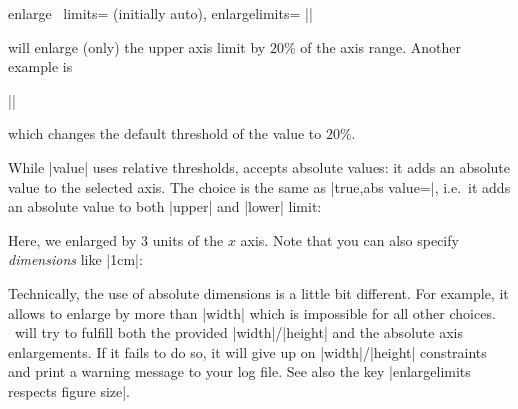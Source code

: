 \begin{pgfplotsxykeylist}{%
	enlarge \x\ limits= (initially auto),
	enlargelimits=}
		||
	
	will enlarge (only) the upper axis limit by $20\%$ of the axis range. Another example is

		||

	which changes the default threshold of the  value to $20\%$.
\begin{codeexample}[]
\end{codeexample}


	 While |value| uses relative thresholds,  accepts absolute values: it adds an absolute value to the selected axis. The choice  is the same as |true,abs value=|, i.e.\ it adds an absolute value to both |upper| and |lower| limit:
\begin{codeexample}[]
\end{codeexample}
	\noindent Here, we enlarged by $3$ units of the $x$ axis. Note that you can also specify \emph{dimensions} like |1cm|:
\begin{codeexample}[]
\end{codeexample}
	\noindent Technically, the use of absolute dimensions is a little bit different. For example, it allows to enlarge by more than |width| which is impossible for all other choices. \PGFPlots\ will try to fulfill both the provided |width|/|height| and the absolute axis enlargements. If it fails to do so, it will give up on |width|/|height| constraints and print a warning message to your log file. See also the key |enlargelimits respects figure size|.


\end{pgfplotsxykeylist}
